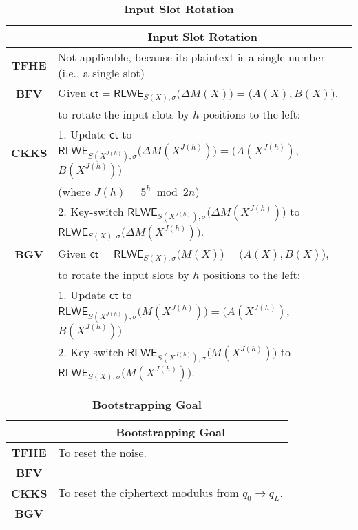 \begin{table}[h]
\begin{tabular}{|c||l|}
\hline
&\multicolumn{1}{c|}{\textbf{Input Slot Rotation}}\\\hline\hline
\textbf{TFHE}&Not applicable, because its plaintext is a single number (i.e., a single slot)\\\hline
\textbf{BFV}&Given $\textsf{ct} = \textsf{RLWE}_{S(X), \sigma}\bm(\Delta M(X)\bm) = \bm(A(X), B(X)\bm)$,\\
&\text{ } to rotate the input slots by $h$ positions to the left:\\
\textbf{CKKS}&1. Update $\textsf{ct}$ to $ \textsf{RLWE}_{S(X^{J(h)}), \sigma}\bm(\Delta M(X^{J(h)})\bm) = \bm(A(X^{J(h)})$, $B(X^{J(h)})\bm)$\\
&\text{ } \text{ } (where $J(h) = 5^h \bmod 2n$)\\
&2. Key-switch $\textsf{RLWE}_{S(X^{J(h)}), \sigma}\bm(\Delta M(X^{J(h)})\bm)$ to $\textsf{RLWE}_{S(X), \sigma}\bm(\Delta M(X^{J(h)})\bm)$. \\\hline
\textbf{BGV}&Given $\textsf{ct} = \textsf{RLWE}_{S(X), \sigma}\bm(M(X)\bm) = \bm(A(X), B(X)\bm)$,\\
&\text{ } to rotate the input slots by $h$ positions to the left:\\
&1. Update $\textsf{ct}$ to $\textsf{RLWE}_{S(X^{J(h)}), \sigma}\bm(M(X^{J(h)})\bm) = \bm(A(X^{J(h)})$, $B(X^{J(h)})\bm)$\\
&2. Key-switch $\textsf{RLWE}_{S(X^{J(h)}), \sigma}\bm( M(X^{J(h)})\bm)$ to $\textsf{RLWE}_{S(X), \sigma}\bm( M(X^{J(h)})\bm)$. \\\hline
\end{tabular}
\caption{\textbf{Input Slot Rotation}}
\end{table}


\begin{table}[h]
\begin{tabular}{|c||l|}
\hline
&\multicolumn{1}{c|}{\textbf{Bootstrapping Goal}}\\\hline\hline
\textbf{TFHE}&To reset the noise.\\
\textbf{BFV}&\\\hline
\textbf{CKKS}&To reset the ciphertext modulus from $q_0 \rightarrow q_L$.\\
\textbf{BGV}&\\\hline
\end{tabular}
\caption{\textbf{Bootstrapping Goal}}
\end{table}

